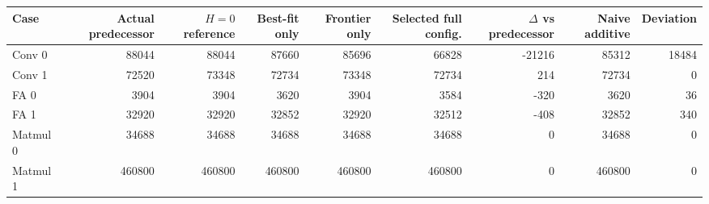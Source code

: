 \begin{tabular}{lrrrrrrrr}
\toprule
Case & Actual predecessor & $H=0$ reference & Best-fit only & Frontier only & Selected full config. & $\Delta$ vs predecessor & Naive additive & Deviation \\
\midrule
Conv 0 & 88044 & 88044 & 87660 & 85696 & 66828 & -21216 & 85312 & 18484 \\
Conv 1 & 72520 & 73348 & 72734 & 73348 & 72734 & 214 & 72734 & 0 \\
FA 0 & 3904 & 3904 & 3620 & 3904 & 3584 & -320 & 3620 & 36 \\
FA 1 & 32920 & 32920 & 32852 & 32920 & 32512 & -408 & 32852 & 340 \\
Matmul 0 & 34688 & 34688 & 34688 & 34688 & 34688 & 0 & 34688 & 0 \\
Matmul 1 & 460800 & 460800 & 460800 & 460800 & 460800 & 0 & 460800 & 0 \\
\bottomrule
\end{tabular}

